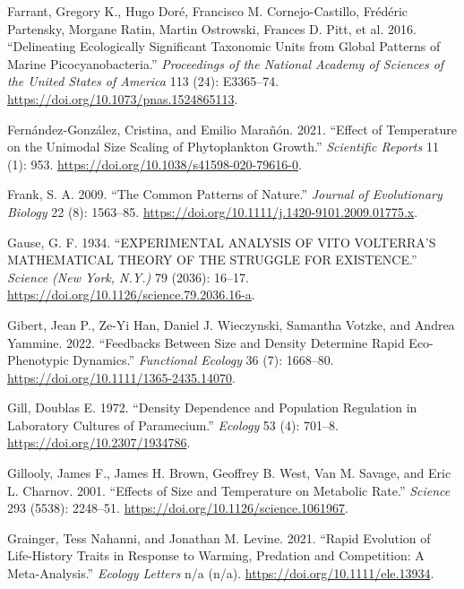 \documentclass[
  letterpaper,
  DIV=11,
  numbers=noendperiod]{scrartcl}
\begin{document}
\begin{CSLReferences}
Farrant, Gregory K., Hugo Doré, Francisco M. Cornejo-Castillo, Frédéric
Partensky, Morgane Ratin, Martin Ostrowski, Frances D. Pitt, et al.
2016. {``Delineating Ecologically Significant Taxonomic Units from
Global Patterns of Marine Picocyanobacteria.''} \emph{Proceedings of the
National Academy of Sciences of the United States of America} 113 (24):
E3365--74. \url{https://doi.org/10.1073/pnas.1524865113}.

Fernández-González, Cristina, and Emilio Marañón. 2021. {``Effect of
Temperature on the Unimodal Size Scaling of Phytoplankton Growth.''}
\emph{Scientific Reports} 11 (1): 953.
\url{https://doi.org/10.1038/s41598-020-79616-0}.

Frank, S. A. 2009. {``The Common Patterns of Nature.''} \emph{Journal of
Evolutionary Biology} 22 (8): 1563--85.
\url{https://doi.org/10.1111/j.1420-9101.2009.01775.x}.

Gause, G. F. 1934. {``{EXPERIMENTAL ANALYSIS OF VITO VOLTERRA}'{S
MATHEMATICAL THEORY OF THE STRUGGLE FOR EXISTENCE}.''} \emph{Science
(New York, N.Y.)} 79 (2036): 16--17.
\url{https://doi.org/10.1126/science.79.2036.16-a}.

Gibert, Jean P., Ze-Yi Han, Daniel J. Wieczynski, Samantha Votzke, and
Andrea Yammine. 2022. {``Feedbacks Between Size and Density Determine
Rapid Eco-Phenotypic Dynamics.''} \emph{Functional Ecology} 36 (7):
1668--80. \url{https://doi.org/10.1111/1365-2435.14070}.

Gill, Doublas E. 1972. {``Density {Dependence} and {Population
Regulation} in {Laboratory Cultures} of {Paramecium}.''} \emph{Ecology}
53 (4): 701--8. \url{https://doi.org/10.2307/1934786}.

Gillooly, James F., James H. Brown, Geoffrey B. West, Van M. Savage, and
Eric L. Charnov. 2001. {``Effects of {Size} and {Temperature} on
{Metabolic Rate}.''} \emph{Science} 293 (5538): 2248--51.
\url{https://doi.org/10.1126/science.1061967}.

Grainger, Tess Nahanni, and Jonathan M. Levine. 2021. {``Rapid Evolution
of Life-History Traits in Response to Warming, Predation and
Competition: {A} Meta-Analysis.''} \emph{Ecology Letters} n/a (n/a).
\url{https://doi.org/10.1111/ele.13934}.


\end{CSLReferences}
\end{document}
